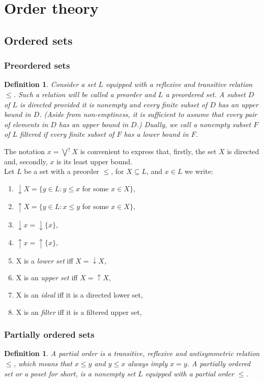 \documentclass[a4paper,12pt]{article}
\newtheorem{definition}[theorem]{Definition}
\begin{document}
\newpage
\section{Order theory}
\subsection{Ordered sets}
\subsubsection{Preordered sets}
\begin{definition} Consider a set $L$ equipped with a reflexive and transitive relation $\leq$. Such a relation will be called a \emph{preorder} and $L$ a \emph{preordered set}. A subset $D$ of $L$ is \emph{directed} provided it is nonempty and every finite subset of $D$ has an upper bound in $D$. (Aside from non-emptiness, it is sufficient to assume that every pair of elements in $D$ has an upper bound in $D$.) Dually, we call a nonempty subset $F$ of $L$ filtered if every finite subset of $F$ has a lower bound in $F$.
\end{definition}

The notation $x = \bigvee^{\uparrow} X$ is convenient to express that, firstly, the set $X$ is directed and, secondly, $x$ is its least upper bound. \\

Let $L$ be a set with a preorder $\leq$, for $X \subseteq L$, and $x \in L$ we write:
\begin{enumerate}
  \item $\downarrow X = \{y \in L: y \leq x$ for some $x \in X\}$,
  \item $\uparrow X = \{y \in L: x \leq y$ for some $x \in X\}$,
  \item $\downarrow x = \downarrow\{x\}$,
  \item $\uparrow x = \uparrow\{x\}$,
  \item X is a \emph{lower set} iff $X = \downarrow X$,
  \item X is an \emph{upper set} iff $X = \uparrow X$,
  \item X is an \emph{ideal} iff it is a directed lower set,
  \item X is an \emph{filter} iff it is a filtered upper set,
\end{enumerate}

\subsubsection{Partially ordered sets}
\begin{definition}
A \emph{partial order} is a transitive, reflexive and antisymmetric relation $\leq$, which means that $x \leq y$ and $y \leq x$ always imply $x = y$. A \emph{partially ordered set} or a \emph{poset} for short, is a nonempty set $L$ equipped with a partial order $\leq$.
\end{definition}
\end{document}
